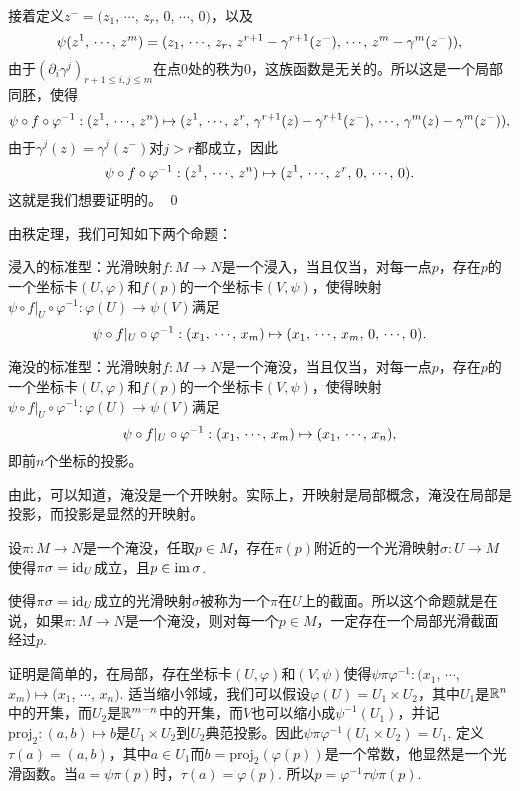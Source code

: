 	接着定义$z^-=(z_1$, $\cdots$, $z_r$, $0$, $\cdots$, $0)$，以及
	\[
	\psi(z^1 ,\,\cdots\hspace{-0.05em},\,  z^m)=(z_1 ,\,\cdots\hspace{-0.05em},\,  z_r,\,z^{r+1}-\gamma^{r+1}(z^-) ,\,\cdots\hspace{-0.05em},\,  z^{m}-\gamma^{m}(z^-)),
	\]
	由于$(\partial_{i}\gamma^j)_{r+1\leq i,j\leq m}$在点$0$处的秩为$0$，这族函数是无关的。所以这是一个局部同胚，使得
	\[
	\psi\circ f\circ \varphi^{-1}:(z^1 ,\,\cdots\hspace{-0.05em},\, z^n)\mapsto (z^1 ,\,\cdots\hspace{-0.05em},\, z^r,\, \gamma^{r+1}(z)-\gamma^{r+1}(z^-) ,\,\cdots\hspace{-0.05em},\, \gamma^m(z)-\gamma^{m}(z^-)),
	\]
	由于$\gamma^j(z)=\gamma^j(z^-)$对$j>r$都成立，因此
	\[
	\psi\circ f\circ \varphi^{-1}:(z^1 ,\,\cdots\hspace{-0.05em},\, z^n)\mapsto (z^1 ,\,\cdots\hspace{-0.05em},\, z^r,\,0 ,\,\cdots\hspace{-0.05em},\, 0).
	\]
	这就是我们想要证明的。
\qed

由秩定理，我们可知如下两个命题：
\begin{compactitem}[~~~--]
\item 浸入的标准型：光滑映射$f:M\to N$是一个浸入，当且仅当，对每一点$p$，存在$p$的一个坐标卡$(U,\varphi)$和$f(p)$的一个坐标卡$(V,\psi)$，使得映射$\psi \circ f|_{U} \circ \varphi^{-1}: \varphi(U)\to \psi(V)$满足
\[
	\psi \circ f|_{U} \circ \varphi^{-1}:(x_1 ,\,\cdots\hspace{-0.05em},\,  x_m)\mapsto (x_1 ,\,\cdots\hspace{-0.05em},\, x_m,\,0 ,\,\cdots\hspace{-0.05em},\, 0).
\]

\item 淹没的标准型：光滑映射$f:M\to N$是一个淹没，当且仅当，对每一点$p$，存在$p$的一个坐标卡$(U,\varphi)$和$f(p)$的一个坐标卡$(V,\psi)$，使得映射$\psi \circ f|_{U} \circ \varphi^{-1}: \varphi(U)\to \psi(V)$满足
\[
	\psi \circ f|_{U} \circ \varphi^{-1}:(x_1,\,\cdots\hspace{-0.05em},\, x_m)\mapsto (x_1,\,\cdots\hspace{-0.05em},\, x_n),
\]
即前$n$个坐标的投影。
\end{compactitem}

由此，可以知道，淹没是一个开映射。实际上，开映射是局部概念，淹没在局部是投影，而投影是显然的开映射。

\lem 设$\pi:M\to N$是一个淹没，任取$p\in M$，存在$\pi(p)$附近的一个光滑映射$\sigma:U\to M$使得$\pi\sigma=\operatorname{id}_U$成立，且$p\in\operatorname{im} \sigma$. 

使得$\pi\sigma=\operatorname{id}_U$成立的光滑映射$\sigma$被称为一个$\pi$在$U$上的截面。所以这个命题就是在说，如果$\pi:M\to N$是一个淹没，则对每一个$p\in M$，一定存在一个局部光滑截面经过$p$.

\proof
	证明是简单的，在局部，存在坐标卡$(U,\varphi)$和$(V,\psi)$使得$\psi\pi\varphi^{-1}:(x_1$, $\cdots$, $x_m)\mapsto (x_1$, $\cdots$, $x_n)$. 适当缩小邻域，我们可以假设$\varphi(U)=U_1\times U_2$，其中$U_1$是$\mathbb{R}^n$中的开集，而$U_2$是$\mathbb{R}^{m-n}$中的开集，而$V$也可以缩小成$\psi^{-1}(U_1)$，并记$\mathrm{proj}_2:(a,b)\mapsto b$是$U_1\times U_2$到$U_2$典范投影。因此$\psi\pi\varphi^{-1}(U_1\times U_2)=U_1$. 定义$\tau(a)=(a,b)$，其中$a\in U_1$而$b=\mathrm{proj}_2(\varphi(p))$是一个常数，他显然是一个光滑函数。当$a=\psi\pi(p)$时，$\tau(a)=\varphi(p)$. 所以$p=\varphi^{-1}\tau \psi\pi(p)$. 

